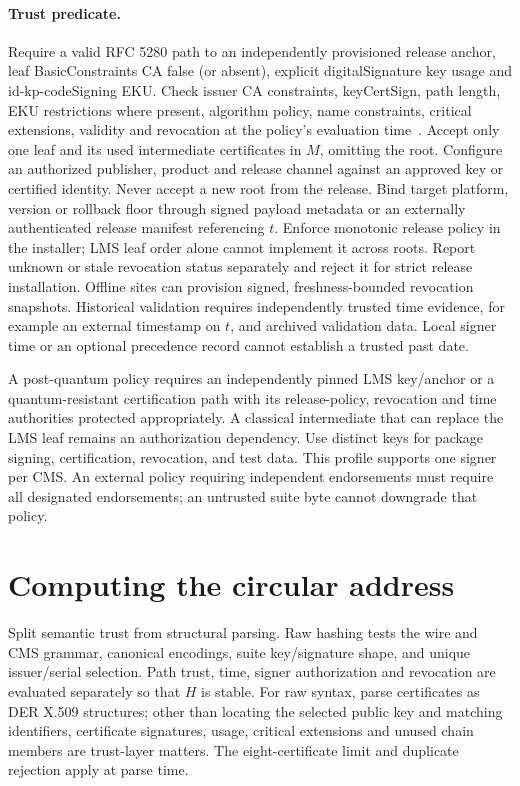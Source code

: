 \documentclass[10pt,twocolumn,letterpaper]{article}
\begin{document}
\paragraph{Trust predicate.}
Require a valid RFC 5280 path to an independently provisioned release anchor, leaf BasicConstraints CA false (or absent), explicit digitalSignature key usage and id-kp-codeSigning EKU. Check issuer CA constraints, keyCertSign, path length, EKU restrictions where present, algorithm policy, name constraints, critical extensions, validity and revocation at the policy's evaluation time~\cite{pki}. Accept only one leaf and its used intermediate certificates in $M$, omitting the root. Configure an authorized publisher, product and release channel against an approved key or certified identity. Never accept a new root from the release. Bind target platform, version or rollback floor through signed payload metadata or an externally authenticated release manifest referencing $t$. Enforce monotonic release policy in the installer; LMS leaf order alone cannot implement it across roots. Report unknown or stale revocation status separately and reject it for strict release installation. Offline sites can provision signed, freshness-bounded revocation snapshots. Historical validation requires independently trusted time evidence, for example an external timestamp on $t$, and archived validation data. Local signer time or an optional precedence record cannot establish a trusted past date.

A post-quantum policy requires an independently pinned LMS key/anchor or a quantum-resistant certification path with its release-policy, revocation and time authorities protected appropriately. A classical intermediate that can replace the LMS leaf remains an authorization dependency. Use distinct keys for package signing, certification, revocation, and test data. This profile supports one signer per CMS. An external policy requiring independent endorsements must require all designated endorsements; an untrusted suite byte cannot downgrade that policy.

\section{Computing the circular address}
Split semantic trust from structural parsing. Raw hashing tests the wire and CMS grammar, canonical encodings, suite key/signature shape, and unique issuer/serial selection. Path trust, time, signer authorization and revocation are evaluated separately so that $H$ is stable. For raw syntax, parse certificates as DER X.509 structures; other than locating the selected public key and matching identifiers, certificate signatures, usage, critical extensions and unused chain members are trust-layer matters. The eight-certificate limit and duplicate rejection apply at parse time.
\end{document}

